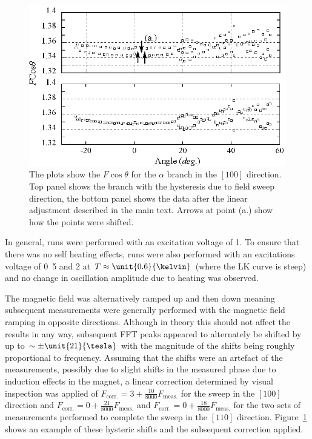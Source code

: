 \begin{figure}[htbp]
    \begin{center}
        \includegraphics[scale=0.9]{Chapter-dHvABaFe2P2/Figures/AngleDepMeasurements/HysteresisCorrection/HysteresisCorrection}
        \caption{The plots show the $F\cos \theta$ for the $\alpha$ branch in the $[100]$ direction. Top panel shows the branch with the hysteresis due to field sweep direction, the bottom panel shows the data after the linear adjustment described in the main text. Arrows at point (a.) show how the points were shifted.}
        \label{Fig:ResD:HysteresisCorrection}
    \end{center}
\end{figure}

In general, runs were performed with an excitation voltage of \unit{1}{\volt}. To ensure that there was no self heating effects, runs were also performed with an excitations voltage of \unit{0.5}{\volt} and \unit{2}{\volt} at $T\approx\unit{0.6}{\kelvin}$ (where the \ac{LK} curve is steep) and no change in oscillation amplitude due to heating was observed.

The magnetic field was alternatively ramped up and then down meaning subsequent measurements were generally performed with the magnetic field ramping in opposite directions. Although in theory this should not affect the results in any way, subsequent \ac{FFT} peaks appeared to alternately be shifted by up to $\sim\pm\unit{21}{\tesla}$ with the magnitude of the shifts being roughly proportional to frequency. Assuming that the shifts were an artefact of the measurements, possibly due to slight shifts in the measured phase due to induction effects in the magnet, a linear correction determined by visual inspection was applied of $F_{\textrm{corr.}} = 3 + \frac{10}{8000} F_{\textrm{meas.}}$ for the sweep in the $[100]$ direction and $F_{\textrm{corr.}} = 0 + \frac{21}{8000}  F_{\textrm{meas.}}$ and  $F_{\textrm{corr.}} = 0 + \frac{18}{8000} F_{\textrm{meas.}}$ for the two sets of measurements performed to complete the sweep in the $[110]$ direction. Figure~\ref{Fig:ResD:HysteresisCorrection} shows an example of these hysteric shifts and the subsequent correction applied.

